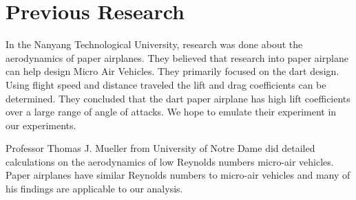 \section{Previous Research}

In the Nanyang Technological University, research was done about the aerodynamics of 
paper airplanes. They believed that research into paper airplane can help design
Micro Air Vehicles. They primarily focused on the dart design. Using flight speed and
distance traveled the lift and drag coefficients can be determined. They concluded that
the dart paper airplane has high lift coefficients over a large range of angle of attacks. 
We hope to emulate their experiment in our experiments.

Professor Thomas J. Mueller from University of Notre Dame did detailed calculations on the aerodynamics of low Reynolds numbers micro-air vehicles. Paper airplanes have similar Reynolds 
numbers to micro-air vehicles and many of his findings are applicable to our analysis.

